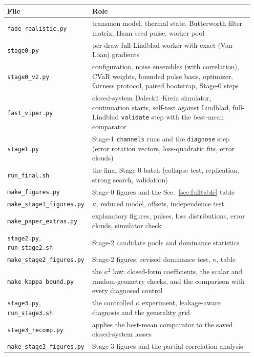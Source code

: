 \documentclass[aps,pra,onecolumn,notitlepage,superscriptaddress,nofootinbib,floatfix]{revtex4-2}
\begin{document}
\begin{center}\small
\begin{tabular}{@{}p{}p{}@{}}
\toprule
File & Role\\
\midrule
\texttt{fade\_realistic.py} & transmon model, thermal state, Butterworth filter matrix, Hann seed pulse, worker pool\\
\texttt{stage0.py} & per-draw full-Lindblad worker with exact (Van Loan) gradients\\
\texttt{stage0\_v2.py} & configuration, noise ensembles (with correlation), CVaR weights, bounded pulse basis, optimizer, fairness protocol, paired bootstrap, Stage-0 steps\\
\texttt{fast\_viper.py} & closed-system Daleckii--Krein simulator, continuation starts, self-test against Lindblad, full-Lindblad \texttt{validate} step with the best-mean comparator\\
\texttt{stage1.py} & Stage-1 \texttt{channels} runs and the \texttt{diagnose} step (error rotation vectors, loss-quadratic fits, error clouds)\\
\texttt{run\_final.sh} & the final Stage-0 batch (collapse test, replication, strong search, validation)\\
\texttt{make\_figures.py} & Stage-0 figures and the Sec.~\ref{sec:fulltable} table\\
\texttt{make\_stage1\_figures.py} & $\kappa$, reduced model, offsets, independence test\\
\texttt{make\_paper\_extras.py} & explanatory figures, pulses, loss distributions, error clouds, simulator check\\
\texttt{stage2.py}, \texttt{run\_stage2.sh} & Stage-2 candidate pools and dominance statistics\\
\texttt{make\_stage2\_figures.py} & Stage-2 figures, revised dominance test, $\kappa$, table\\
\texttt{make\_kappa\_bound.py} & the $\kappa^2$ law: closed-form coefficients, the scalar and random-geometry checks, and the comparison with every diagnosed control\\
\texttt{stage3.py}, \texttt{run\_stage3.sh} & the controlled $\kappa$ experiment, leakage-aware diagnosis and the generality grid\\
\texttt{stage3\_recomp.py} & applies the best-mean comparator to the saved closed-system losses\\
\texttt{make\_stage3\_figures.py} & Stage-3 figures and the partial-correlation analysis\\
\bottomrule
\end{tabular}
\end{center}
\end{document}
